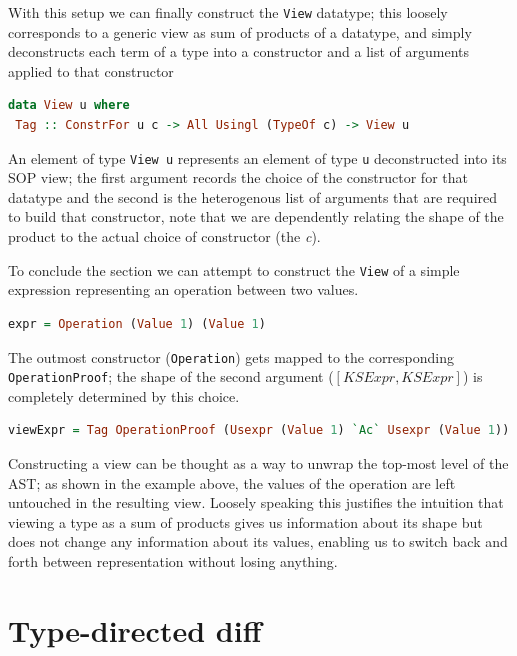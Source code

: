 \documentclass[11pt]{article}
\begin{document}
With this setup we can finally construct the \texttt{View} datatype;
this loosely corresponds to a generic view as sum of products of a
datatype, and simply deconstructs each term of a type into a constructor
and a list of arguments applied to that constructor

\begin{lstlisting}[language=haskell]
data View u where
 Tag :: ConstrFor u c -> All Usingl (TypeOf c) -> View u
\end{lstlisting}

An element of type \texttt{View u} represents an element of type \texttt{u} 
deconstructed into its SOP view; the first argument records the choice 
of the constructor for that datatype and the second is the heterogenous list of 
arguments that are required to build that constructor, note that we are 
dependently relating the shape of the product to the actual choice of 
constructor (the \emph{c}).

To conclude the section we can attempt to construct the \texttt{View} of a 
simple expression representing an operation between two values.

\begin{lstlisting}[language=haskell]
  expr = Operation (Value 1) (Value 1)
\end{lstlisting}

The outmost constructor (\texttt{Operation}) gets mapped to the corresponding 
\texttt{OperationProof}; the shape of the second 
argument ($[KSExpr, KSExpr]$) is completely determined by 
this choice.

\begin{lstlisting}[language=haskell]
  viewExpr = Tag OperationProof (Usexpr (Value 1) `Ac` Usexpr (Value 1))
\end{lstlisting}

Constructing a view can be thought as a way to unwrap the top-most level of the 
AST; as shown in the example above, the values of the operation are left untouched in 
the resulting view. Loosely speaking this justifies the intuition that 
viewing a type as a sum of products gives us information about its shape but 
does not change any information about its values, enabling us to switch back and 
forth between representation without losing anything.


\section{Type-directed diff}\label{type-directed-diff}
\end{document}
